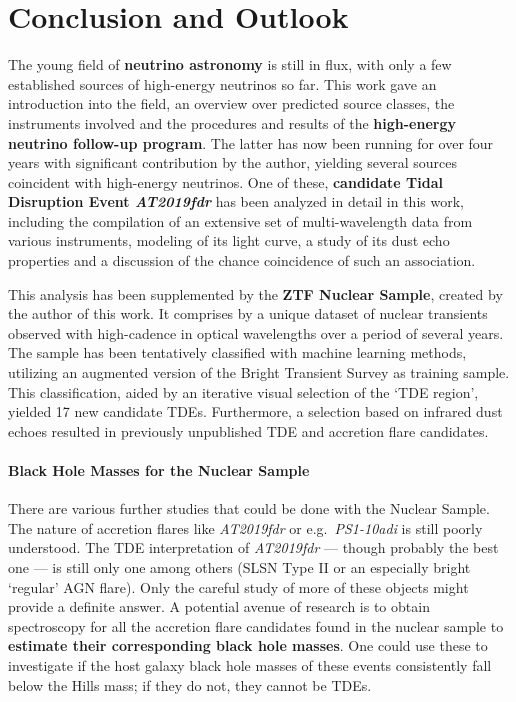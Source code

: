 \chapter*{Conclusion and Outlook}\label{conclusion}
The young field of \textbf{neutrino astronomy} is still in flux, with only a few established sources of high-energy neutrinos so far. This work gave an introduction into the field, an overview over predicted source classes, the instruments involved and the procedures and results of the \textbf{high-energy neutrino follow-up program}. The latter has now been running for over four years with significant contribution by the author, yielding several sources coincident with high-energy neutrinos. One of these, \textbf{candidate Tidal Disruption Event \textit{AT2019fdr}} has been analyzed in detail in this work, including the compilation of an extensive set of multi-wavelength data from various instruments, modeling of its light curve, a study of its dust echo properties and a discussion of the chance coincidence of such an association.

This analysis has been supplemented by the \textbf{ZTF Nuclear Sample}, created by the author of this work. It comprises by a unique dataset of nuclear transients observed with high-cadence in optical wavelengths over a period of several years. The sample has been tentatively classified with machine learning methods, utilizing an augmented version of the Bright Transient Survey as training sample. This classification, aided by an iterative visual selection of the `TDE region', yielded 17 new candidate TDEs. Furthermore, a selection based on infrared dust echoes resulted in \xx previously unpublished TDE and accretion flare candidates.

\subsubsection{Black Hole Masses for the Nuclear Sample}
There are various further studies that could be done with the Nuclear Sample. The nature of accretion flares like \textit{AT2019fdr} or e.g.~\textit{PS1-10adi} is still poorly understood. The TDE interpretation of \textit{AT2019fdr} --- though probably the best one ---  is still only one among others (SLSN Type II or an especially bright `regular' AGN flare). Only the careful study of more of these objects might provide a definite answer. A potential avenue of research is to obtain spectroscopy for all the accretion flare candidates found in the nuclear sample to \textbf{estimate their corresponding black hole masses}. One could use these to investigate if the host galaxy black hole masses of these events consistently fall below the Hills mass; if they do not, they cannot be TDEs.

